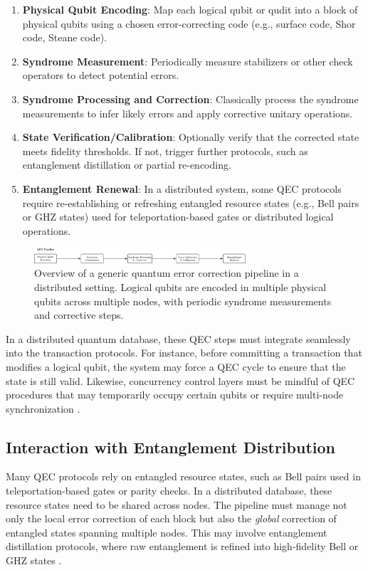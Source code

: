 \documentclass[11pt]{article}
\begin{document}
\begin{enumerate}
    \item \textbf{Physical Qubit Encoding}: Map each logical qubit or qudit into a block of physical qubits using a chosen error-correcting code (e.g., surface code, Shor code, Steane code).
    \item \textbf{Syndrome Measurement}: Periodically measure stabilizers or other check operators to detect potential errors.
    \item \textbf{Syndrome Processing and Correction}: Classically process the syndrome measurements to infer likely errors and apply corrective unitary operations.
    \item \textbf{State Verification/Calibration}: Optionally verify that the corrected state meets fidelity thresholds. If not, trigger further protocols, such as entanglement distillation or partial re-encoding.
    \item \textbf{Entanglement Renewal}: In a distributed system, some QEC protocols require re-establishing or refreshing entangled resource states (e.g., Bell pairs or GHZ states) used for teleportation-based gates or distributed logical operations.
\end{enumerate}

\begin{figure}[H]
    \centering
    \includegraphics[width=0.7\textwidth]{qec_pipeline_fig.png}
    \caption{Overview of a generic quantum error correction pipeline in a distributed setting. Logical qubits are encoded in multiple physical qubits across multiple nodes, with periodic syndrome measurements and corrective steps.}
    \label{fig:qec_pipeline}
\end{figure}

In a distributed quantum database, these QEC steps must integrate seamlessly into the transaction protocols. For instance, before committing a transaction that modifies a logical qubit, the system may force a QEC cycle to ensure that the state is still valid. Likewise, concurrency control layers must be mindful of QEC procedures that may temporarily occupy certain qubits or require multi-node synchronization \cite{fowler, campbell}.

\subsection{Interaction with Entanglement Distribution}
Many QEC protocols rely on entangled resource states, such as Bell pairs used in teleportation-based gates or parity checks. In a distributed database, these resource states need to be shared across nodes. The pipeline must manage not only the local error correction of each block but also the \emph{global} correction of entangled states spanning multiple nodes. This may involve entanglement distillation protocols, where raw entanglement is refined into high-fidelity Bell or GHZ states \cite{bennett, pan_distillation}.
\end{document}
